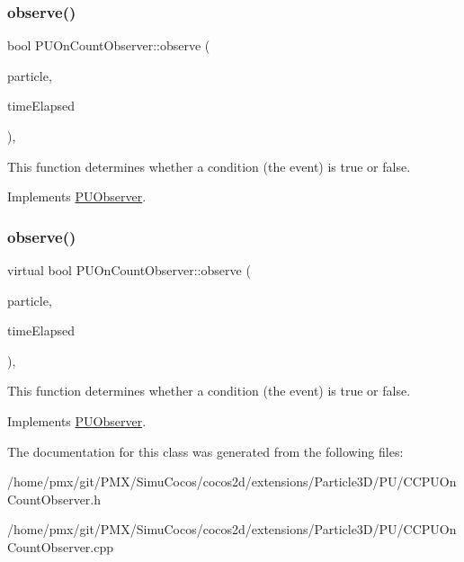 \subsubsection{\texorpdfstring{observe()}{observe()}\hspace{0.1cm}{\footnotesize\ttfamily [1/2]}}
{\footnotesize\ttfamily bool P\+U\+On\+Count\+Observer\+::observe (\begin{DoxyParamCaption}\item[{\hyperlink{structPUParticle3D}{P\+U\+Particle3D} $\ast$}]{particle,  }\item[{float}]{time\+Elapsed }\end{DoxyParamCaption})\hspace{0.3cm}{\ttfamily [override]}, {\ttfamily [virtual]}}

This function determines whether a condition (the event) is true or false. 

Implements \hyperlink{classPUObserver_a50f59cc3245e291b641463db5d3037f7}{P\+U\+Observer}.

\mbox{\label{classPUOnCountObserver_ae183110704061276d72a79b3c746677f}} 
\subsubsection{\texorpdfstring{observe()}{observe()}\hspace{0.1cm}{\footnotesize\ttfamily [2/2]}}
{\footnotesize\ttfamily virtual bool P\+U\+On\+Count\+Observer\+::observe (\begin{DoxyParamCaption}\item[{\hyperlink{structPUParticle3D}{P\+U\+Particle3D} $\ast$}]{particle,  }\item[{float}]{time\+Elapsed }\end{DoxyParamCaption})\hspace{0.3cm}{\ttfamily [override]}, {\ttfamily [virtual]}}

This function determines whether a condition (the event) is true or false. 

Implements \hyperlink{classPUObserver_a50f59cc3245e291b641463db5d3037f7}{P\+U\+Observer}.



The documentation for this class was generated from the following files\+:\begin{DoxyCompactItemize}
\item 
/home/pmx/git/\+P\+M\+X/\+Simu\+Cocos/cocos2d/extensions/\+Particle3\+D/\+P\+U/C\+C\+P\+U\+On\+Count\+Observer.\+h\item 
/home/pmx/git/\+P\+M\+X/\+Simu\+Cocos/cocos2d/extensions/\+Particle3\+D/\+P\+U/C\+C\+P\+U\+On\+Count\+Observer.\+cpp\end{DoxyCompactItemize}
